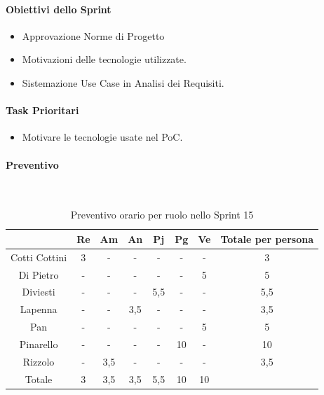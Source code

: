 \documentclass{article}
\begin{document}
                \paragraph{Obiettivi dello Sprint}
                    \begin{itemize}
                        \item Approvazione Norme di Progetto
                        \item Motivazioni delle tecnologie utilizzate.
                        \item Sistemazione Use Case in Analisi dei Requisiti.
                    \end{itemize}

                \paragraph{Task Prioritari}
                    \begin{itemize}
                        \item Motivare le tecnologie usate nel PoC.
                    \end{itemize}                

                \paragraph{Preventivo}\mbox{}\\
                \begin{table}[H]
                    \centering
                    \begin{tabular}{|c|c|c|c|c|c|c|c|}
                    \hline
                                  & Re  & Am  & An  & Pj  & Pg  & Ve  & Totale per persona \\ \hline
                    Cotti Cottini & 3   & -   & -   & -   & -   & -   & 3                  \\ \hline
                    Di Pietro     & -   & -   & -   & -   & -   & 5   & 5                  \\ \hline
                    Diviesti      & -   & -   & -   & 5,5 & -   & -   & 5,5                \\ \hline
                    Lapenna       & -   & -   & 3,5 & -   & -   & -   & 3,5                \\ \hline
                    Pan           & -   & -   & -   & -   & -   & 5   & 5                  \\ \hline
                    Pinarello     & -   & -   & -   & -   & 10  & -   & 10                 \\ \hline
                    Rizzolo       & -   & 3,5 & -   & -   & -   & -   & 3,5                \\ \hline
                    Totale        & 3   & 3,5 & 3,5 & 5,5 & 10  & 10  &                    \\ \hline
                    \end{tabular}
                    \caption{Preventivo orario per ruolo nello Sprint 15}
                \end{table}
\end{document}
